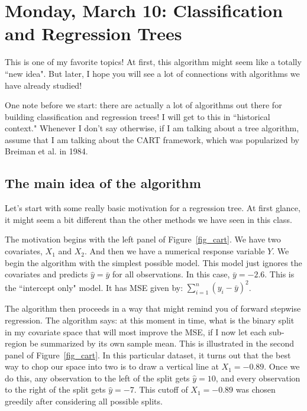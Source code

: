 \section{Monday, March 10: Classification and Regression Trees}

This is one of my favorite topics! At first, this algorithm might seem like a totally ``new idea". But later, I hope you will see a lot of connections with algorithms we have already studied!

One note before we start: there are actually a lot of algorithms out there for building classification and regression trees! I will get to this in ``historical context." Whenever I don't say otherwise, if I am talking about a tree algorithm, assume that I am talking about the CART framework, which was popularized by Breiman et al. in 1984. 

\subsection{The main idea of the algorithm}

Let's start with some really basic motivation for a regression tree. At first glance, it might seem a bit different than the other methods we have seen in this class. 

The motivation begins with the left panel of Figure~\ref{fig_cart}. We have two covariates, $X_1$ and $X_2$. And then we have a numerical response variable $Y$. We begin the algorithm with the simplest possible model. This model just ignores the covariates and predicts $\hat{y} = \bar{y}$ for all observations. In this case, $\bar{y} = -2.6$. This is the ``intercept only" model. It has MSE given by: $\sum_{i=1}^n (y_i - \bar{y})^2$.

The algorithm then proceeds in a way that might remind you of forward stepwise regression. The algorithm says: at this moment in time, what is the binary split in my covariate space that will most improve the MSE, if I now let each sub-region be summarized by its own sample mean. This is illustrated in the second panel of Figure~\ref{fig_cart}. In this particular dataset, it turns out that the best way to chop our space into two is to draw a vertical line at $X_1 = -0.89$. Once we do this, any observation to the left of the split gets $\hat{y}=10$, and every observation to the right of the split gets $\hat{y}=-7$. This cutoff of $X_1 = -0.89$ was chosen greedily after considering all possible splits.

